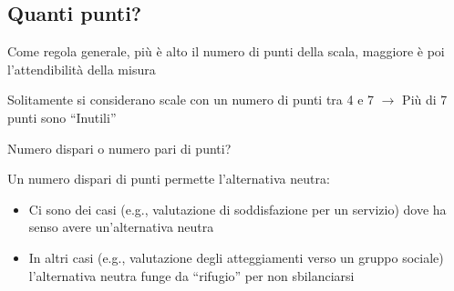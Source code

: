 \documentclass[compress]{beamer}
\begin{document}
\begin{frame}



\vspace{5mm}	
\pause
	

	
	
\end{frame}

\subsection*{Quanti punti?}

\begin{frame}
	Come regola generale, più è alto il numero di punti della scala, maggiore è poi l'attendibilità della misura
	
	Solitamente si considerano scale con un numero di punti tra 4 e 7 $\rightarrow$ Più di 7 punti sono ``Inutili''
	
	Numero dispari o numero pari di punti? 
	
	Un numero dispari di punti permette l'alternativa neutra: 
	
	\begin{itemize}
		\item Ci sono dei casi (e.g., valutazione di soddisfazione per un servizio) dove ha senso avere un'alternativa neutra 
		\item In altri casi (e.g., valutazione degli atteggiamenti verso un gruppo sociale) l'alternativa neutra funge da ``rifugio'' per non sbilanciarsi
	\end{itemize}
\end{frame}
\end{document}
